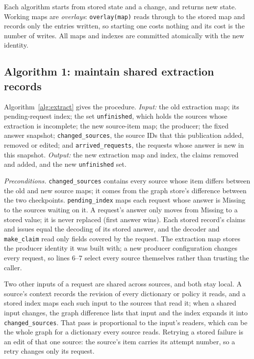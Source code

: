 \documentclass[11pt]{article}
\newcommand{\code}[1]{\texttt{#1}}
\begin{document}
Each algorithm starts from stored state and a change, and returns new state.
Working maps are \emph{overlays}: \code{overlay(map)} reads through to the
stored map and records only the entries written, so starting one costs nothing
and its cost is the number of writes. All maps and indexes are committed
atomically with the new identity.

\subsection{Algorithm 1: maintain shared extraction records}

Algorithm~\ref{alg:extract} gives the procedure. \textit{Input:} the old
extraction map; its pending-request index; the set \code{unfinished}, which
holds the sources whose extraction is incomplete; the new
source-item map; the producer; the fixed answer snapshot; \code{changed\_sources},
the source IDs that this publication added, removed or edited; and
\code{arrived\_requests}, the requests whose answer is new in this snapshot.
\textit{Output:} the new extraction map and index, the claims removed and
added, and the new \code{unfinished} set.

\textit{Preconditions.} \code{changed\_sources} contains every source whose item
differs between the old and new source maps; it comes from the graph store's
difference between the two checkpoints. \code{pending\_index} maps each request
whose answer is Missing to the sources waiting on it. A request's answer only
moves from Missing to a stored value; it is never replaced (first answer wins).
Each stored record's claims and issues equal the decoding of its stored answer,
and the decoder and \code{make\_claim} read only fields covered by the request.
The extraction map stores the producer identity it was built with; a new
producer configuration changes every request, so lines 6--7 select every source
themselves rather than trusting the caller.

Two other inputs of a request are shared across sources, and both stay local.
A source's context records the revision of every dictionary or policy it reads,
and a stored index maps each such input to the sources that read it; when a
shared input changes, the graph difference lists that input and the index
expands it into \code{changed\_sources}. That pass is proportional to the
input's readers, which can be the whole graph for a dictionary every source
reads. Retrying a stored failure is an edit of that one source: the source's
item carries its attempt number, so a retry changes only its request.
\end{document}
